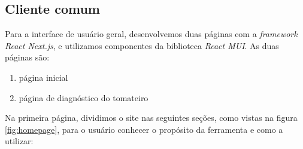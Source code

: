 \subsection{Cliente comum}

Para a interface de usuário geral, desenvolvemos duas páginas com a \textit{framework} \emph{React Next.js}, e utilizamos componentes da biblioteca \emph{React MUI}. As duas páginas são:

\begin{enumerate}
    \item página inicial
    \item página de diagnóstico do tomateiro
\end{enumerate}

Na primeira página, dividimos o site nas seguintes seções, como vistas na figura \ref{fig:homepage}, para o usuário conhecer o propósito da ferramenta e como a utilizar:

